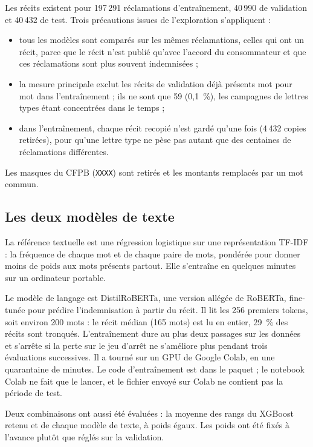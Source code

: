 \documentclass[11pt,a4paper]{article}
\begin{document}
Les récits existent pour 197\,291 réclamations d'entraînement, 40\,990 de validation et 40\,432 de test. Trois précautions issues de l'exploration s'appliquent :
\begin{itemize}
  \item tous les modèles sont comparés sur les mêmes réclamations, celles qui ont un récit, parce que le récit n'est publié qu'avec l'accord du consommateur et que ces réclamations sont plus souvent indemnisées ;
  \item la mesure principale exclut les récits de validation déjà présents mot pour mot dans l'entraînement ; ils ne sont que 59 (0,1~\%), les campagnes de lettres types étant concentrées dans le temps ;
  \item dans l'entraînement, chaque récit recopié n'est gardé qu'une fois (4\,432 copies retirées), pour qu'une lettre type ne pèse pas autant que des centaines de réclamations différentes.
\end{itemize}

Les masques du CFPB (\texttt{XXXX}) sont retirés et les montants remplacés par un mot commun.

\subsection{Les deux modèles de texte}

La référence textuelle est une régression logistique sur une représentation TF-IDF : la fréquence de chaque mot et de chaque paire de mots, pondérée pour donner moins de poids aux mots présents partout. Elle s'entraîne en quelques minutes sur un ordinateur portable.

Le modèle de langage est DistilRoBERTa, une version allégée de RoBERTa, fine-tunée pour prédire l'indemnisation à partir du récit. Il lit les 256 premiers tokens, soit environ 200 mots : le récit médian (165 mots) est lu en entier, 29~\% des récits sont tronqués. L'entraînement dure au plus deux passages sur les données et s'arrête si la perte sur le jeu d'arrêt ne s'améliore plus pendant trois évaluations successives. Il a tourné sur un GPU de Google Colab, en une quarantaine de minutes. Le code d'entraînement est dans le paquet ; le notebook Colab ne fait que le lancer, et le fichier envoyé sur Colab ne contient pas la période de test.

Deux combinaisons ont aussi été évaluées : la moyenne des rangs du XGBoost retenu et de chaque modèle de texte, à poids égaux. Les poids ont été fixés à l'avance plutôt que réglés sur la validation.
\end{document}
